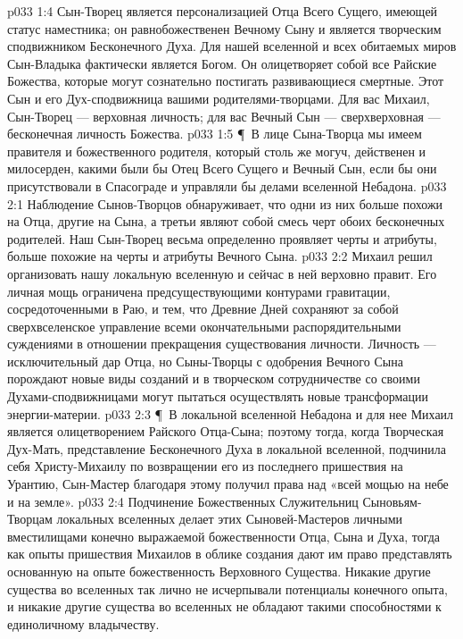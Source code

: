\vs p033 1:4 Сын\hyp{}Творец является персонализацией Отца Всего Сущего, имеющей статус наместника; он равнобожественен Вечному Сыну и является творческим сподвижником Бесконечного Духа. Для нашей вселенной и всех обитаемых миров Сын\hyp{}Владыка фактически является Богом. Он олицетворяет собой все Райские Божества, которые могут сознательно постигать развивающиеся смертные. Этот Сын и его Дух\hyp{}сподвижница  вашими родителями\hyp{}творцами. Для вас Михаил, Сын\hyp{}Творец --- верховная личность; для вас Вечный Сын --- сверхверховная --- бесконечная личность Божества.
\vs p033 1:5 \P\ В лице Сына\hyp{}Творца мы имеем правителя и божественного родителя, который столь же могуч, действенен и милосерден, какими были бы Отец Всего Сущего и Вечный Сын, если бы они присутствовали в Спасограде и управляли бы делами вселенной Небадона.
\vs p033 2:1 Наблюдение Сынов\hyp{}Творцов обнаруживает, что одни из них больше похожи на Отца, другие на Сына, а третьи являют собой смесь черт обоих бесконечных родителей. Наш Сын\hyp{}Творец весьма определенно проявляет черты и атрибуты, больше похожие на черты и атрибуты Вечного Сына.
\vs p033 2:2 Михаил решил организовать нашу локальную вселенную и сейчас в ней верховно правит. Его личная мощь ограничена предсуществующими контурами гравитации, сосредоточенными в Раю, и тем, что Древние Дней сохраняют за собой сверхвселенское управление всеми окончательными распорядительными суждениями в отношении прекращения существования личности. Личность --- исключительный дар Отца, но Сыны\hyp{}Творцы с одобрения Вечного Сына порождают новые виды созданий и в творческом сотрудничестве со своими Духами\hyp{}сподвижницами могут пытаться осуществлять новые трансформации энергии\hyp{}материи.
\vs p033 2:3 \P\ В локальной вселенной Небадона и для нее Михаил является олицетворением Райского Отца\hyp{}Сына; поэтому тогда, когда Творческая Дух\hyp{}Мать, представление Бесконечного Духа в локальной вселенной, подчинила себя Христу\hyp{}Михаилу по возвращении его из последнего пришествия на Урантию, Сын\hyp{}Мастер благодаря этому получил права над «всей мощью на небе и на земле».
\vs p033 2:4 Подчинение Божественных Служительниц Сыновьям\hyp{}Творцам локальных вселенных делает этих Сыновей\hyp{}Мастеров личными вместилищами конечно выражаемой божественности Отца, Сына и Духа, тогда как опыты пришествия Михаилов в облике создания дают им право представлять основанную на опыте божественность Верховного Существа. Никакие другие существа во вселенных так лично не исчерпывали потенциалы конечного опыта, и никакие другие существа во вселенных не обладают такими способностями к единоличному владычеству.
